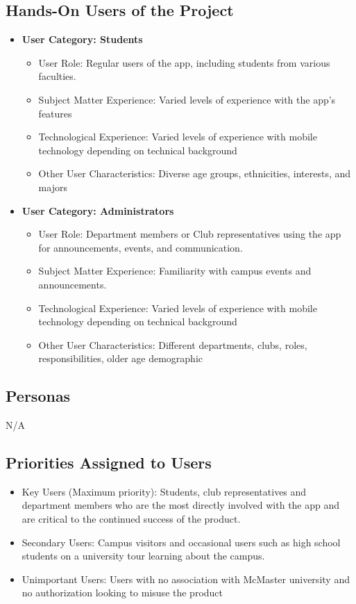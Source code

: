 \documentclass[12pt]{article}
\begin{document}
\subsection{Hands-On Users of the Project}
\begin{itemize}
 \item \textbf{User Category: Students}
\begin{itemize}
\item User Role: Regular users of the app, including students from various faculties.

\item Subject Matter Experience: Varied levels of experience with the app's features

\item Technological Experience: Varied levels of experience with mobile technology depending on technical background

\item Other User Characteristics: Diverse age groups, ethnicities, interests, and majors
\end{itemize}


\item \textbf{User Category: Administrators}
\begin{itemize}
\item User Role: Department members or Club representatives using the app for announcements, events, and communication.

\item Subject Matter Experience: Familiarity with campus events and announcements.

\item Technological Experience: Varied levels of experience with mobile technology depending on technical background

\item Other User Characteristics: Different departments, clubs, roles, responsibilities, older age demographic
\end{itemize}
\end{itemize}

\subsection{Personas}
N/A
\subsection{Priorities Assigned to Users}

\begin{itemize}
\item Key Users (Maximum priority): Students, club representatives and department members who are the most directly involved with the app and are critical to the continued success of the product.

\item Secondary Users: Campus visitors and occasional users such as high school students on a university tour learning about the campus.

\item Unimportant Users: Users with no association with McMaster university and no authorization looking to misuse the product
\end{itemize}
\end{document}
